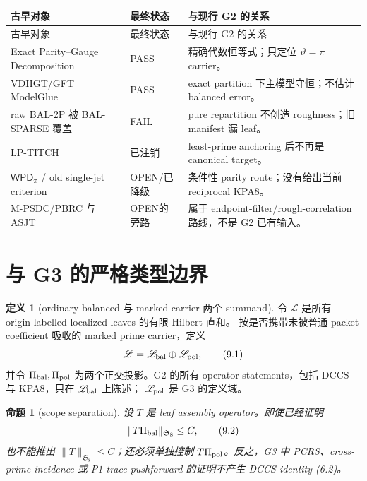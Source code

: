 \documentclass[11pt,a4paper]{ctexart}
\newtheorem{proposition}[theorem]{命题}
\theoremstyle{definition}
\newtheorem{definition}[theorem]{定义}
\newcommand{\1}{\mathbf 1}
\newcommand{\OPEN}{\textcolor{red!70!black}{\textsf{OPEN}}}
\newcommand{\PASS}{\textcolor{green!45!black}{\textsf{PASS}}}
\newcommand{\FAIL}{\textcolor{red!70!black}{\textsf{FAIL}}}
\begin{document}
\begin{center}
\begin{longtable}{p{}p{}p{}}
\toprule
古早对象 & 最终状态 & 与现行 G2 的关系\\
\midrule
\endfirsthead
\toprule 古早对象 & 最终状态 & 与现行 G2 的关系\\\midrule\endhead
Exact Parity--Gauge Decomposition & \PASS
& 精确代数恒等式；只定位 $\vartheta=\pi$ carrier。\\
VDHGT/GFT ModelGlue & \PASS
& exact partition 下主模型守恒；不估计 balanced error。\\
raw BAL-2P 被 BAL-SPARSE 覆盖 & \FAIL
& pure repartition 不创造 roughness；旧 manifest 漏 leaf。\\
LP-TITCH & 已注销
& least-prime anchoring 后不再是 canonical target。\\
$\mathsf{WPD}_\pi$ / old single-jet criterion & \OPEN/已降级
& 条件性 parity route；没有给出当前 reciprocal KPA8。\\
M-PSDC/PBRC 与 ASJT & \OPEN 的旁路
& 属于 endpoint-filter/rough-correlation 路线，不是 G2 已有输入。\\
\bottomrule
\end{longtable}
\end{center}

\section{与 G3 的严格类型边界}

\begin{definition}[ordinary balanced 与 marked-carrier 两个 summand]
令 $\mathscr L$ 是所有 origin-labelled localized leaves 的有限 Hilbert 直和。
按是否携带未被普通 packet coefficient 吸收的 marked prime carrier，定义
\[
\mathscr L=\mathscr L_{\rm bal}\oplus\mathscr L_{\rm pol},
\tag{9.1}
\]
并令 $\Pi_{\rm bal},\Pi_{\rm pol}$ 为两个正交投影。G2 的所有 operator
statements，包括 DCCS 与 KPA8，只在 $\mathscr L_{\rm bal}$ 上陈述；
$\mathscr L_{\rm pol}$ 是 G3 的定义域。
\end{definition}

\begin{proposition}[scope separation]\label{prop:scope-separation}
设 $T$ 是 leaf assembly operator。即使已经证明
\[
\|T\Pi_{\rm bal}\|_{\mathfrak S_8}\le C,
\tag{9.2}
\]
也不能推出 $\|T\|_{\mathfrak S_8}\le C$；还必须单独控制
$T\Pi_{\rm pol}$。反之，G3 中 PCRS、cross-prime incidence 或 P1
trace-pushforward 的证明不产生 DCCS identity (6.2)。
\end{proposition}
\end{document}
